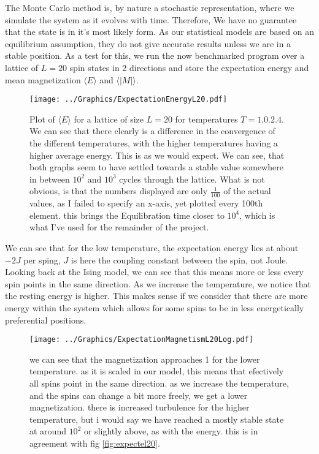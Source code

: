 \documentclass[10pt, twocolumn]{revtex4-1}
\begin{document}
The Monte Carlo method is, by nature a stochastic representation, where we simulate the system as it evolves with time. Therefore, We have no guarantee that
the state is in it's most likely form. As our statistical models are based on an equilibrium assumption, they do not give accurate results unless we are in
a stable position. As a test for this, we run the now benchmarked program over a lattice of $L=20$ spin states in 2 directions and store the expectation
energy and mean magnetization $\langle E \rangle$ and $\langle |M| \rangle$.
\begin{figure}[hbtp]
\texttt{[image: ../Graphics/ExpectationEnergyL20.pdf]}
    \caption{Plot of $\langle E \rangle$ for a lattice of size $L=20$ for temperatures $T = \qty{ 1.0, 2.4 }$. We can see that there clearly is
        a difference in the convergence of the different temperatures, with the higher temperatures having a higher average energy. This
        is as we would expect. We can see, that both graphs seem to have settled towards a stable value somewhere in between $10^2$ and $10^3$
        cycles through the lattice. What is not obvious, is that the numbers displayed are only $\frac{1}{100}$ of the actual values, as I failed
        to specify an x-axis, yet plotted every 100th element. this brings the Equilibration time closer to $10^4$, which is what I've used for the
        remainder of the project.}
\label{fig:ExpectEL20}
\end{figure}
We can see that for the low temperature, the expectation energy lies at about $-2J$ per sping, $J$ is here the coupling constant between the spin, not
Joule. Looking back at the Ising model, we can see that this means more or less every spin points in the same direction. As we increase the temperature,
we notice that the resting energy is higher. This makes sense if we consider that there are more energy within the system which allows for some spins to be
in less energetically preferential positions.
\begin{figure}[hbtp]
    \texttt{[image: ../Graphics/ExpectationMagnetismL20Log.pdf]}
    \caption{we can see that the magnetization approaches 1 for the lower temperature. as it is scaled in our model, this means that efectively all spins
    point in the same direction. as we increase the temperature, and the spins can change a bit more freely, we get a lower magnetization. there is increased
    turbulence for the higher temperature, but i would say we have reached a mostly stable state at around $10^2$ or slightly above, as with the energy.
    this is in agreement with fig \ref{fig:expectel20}.}
\label{fig:expectml20}
\end{figure}
\end{document}

